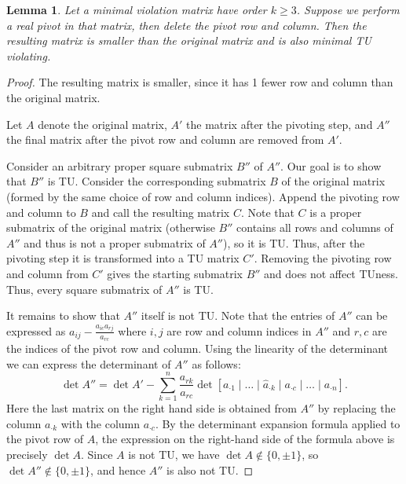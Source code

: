 \documentclass{article}
\newtheorem{lemma}{Lemma}
\theoremstyle{definition}
\begin{document}
\begin{lemma}\label{lem:mvm_pivot_smaller_mvm}
    Let a minimal violation matrix have order $k \geq 3$. Suppose we perform a real pivot in that matrix, then delete the pivot row and column. Then the resulting matrix is smaller than the original matrix and is also minimal TU violating.
\end{lemma}

\begin{proof}
    The resulting matrix is smaller, since it has 1 fewer row and column than the original matrix.

    Let $A$ denote the original matrix, $A'$ the matrix after the pivoting step, and $A''$ the final matrix after the pivot row and column are removed from $A'$.

    Consider an arbitrary proper square submatrix $B''$ of $A''$. Our goal is to show that $B''$ is TU. Consider the corresponding submatrix $B$ of the original matrix (formed by the same choice of row and column indices). Append the pivoting row and column to $B$ and call the resulting matrix $C$. Note that $C$ is a proper submatrix of the original matrix (otherwise $B''$ contains all rows and columns of $A''$ and thus is not a proper submatrix of $A''$), so it is TU. Thus, after the pivoting step it is transformed into a TU matrix $C'$. Removing the pivoting row and column from $C'$ gives the starting submatrix $B''$ and does not affect TUness. Thus, every square submatrix of $A''$ is TU.

    It remains to show that $A''$ itself is not TU. Note that the entries of $A''$ can be expressed as $a_{ij} - \frac{a_{ic} a_{rj}}{a_{rc}}$ where $i, j$ are row and column indices in $A''$ and $r, c$ are the indices of the pivot row and column. Using the linearity of the determinant we can express the determinant of $A''$ as follows:
    \[
        \det A'' = \det A' - \sum_{k = 1}^{n} \frac{a_{rk}}{a_{rc}} \det \left[ a_{\cdot 1} \mid \dots \mid \hat{a}_{\cdot k} \mid a_{\cdot c} \mid \dots \mid a_{\cdot n} \right].
    \]
    Here the last matrix on the right hand side is obtained from $A''$ by replacing the column $a_{\cdot k}$ with the column $a_{\cdot c}$. By the determinant expansion formula applied to the pivot row of $A$, the expression on the right-hand side of the formula above is precisely $\det A$. Since $A$ is not TU, we have $\det A \notin \{0, \pm 1\}$, so $\det A'' \notin \{0, \pm 1\}$, and hence $A''$ is also not TU.
\end{proof}
\end{document}
